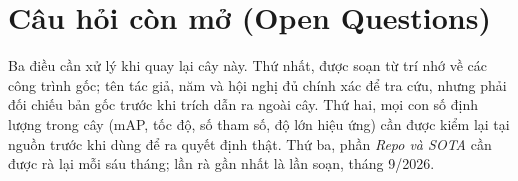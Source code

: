 \documentclass[deep_learning.tex]{subfiles}
\begin{document}
\section*{Câu hỏi còn mở (Open Questions)}

Ba điều cần xử lý khi quay lại cây này. Thứ nhất,  được soạn từ trí nhớ về các công trình gốc; tên tác giả, năm và hội nghị đủ chính xác để tra cứu, nhưng phải đối chiếu bản gốc trước khi trích dẫn ra ngoài cây. Thứ hai, mọi con số định lượng trong cây (mAP, tốc độ, số tham số, độ lớn hiệu ứng) cần được kiểm lại tại nguồn trước khi dùng để ra quyết định thật. Thứ ba, phần \emph{Repo và SOTA} cần được rà lại mỗi sáu tháng; lần rà gần nhất là lần soạn, tháng 9/2026.
\end{document}
